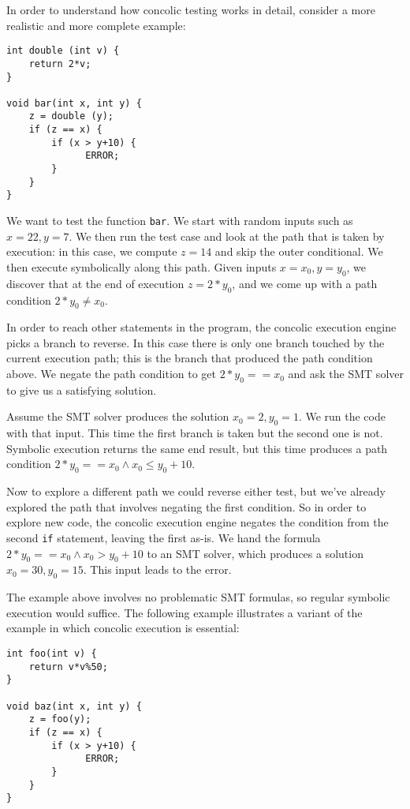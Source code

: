 \documentclass[11pt]{article}
\begin{document}
In order to understand how concolic testing works in detail, consider a more
realistic and more complete example:

\begin{lstlisting}
int double (int v) { 
	return 2*v; 
}

void bar(int x, int y) {
	z = double (y);
	if (z == x) {
		if (x > y+10) {
		      ERROR;
		}	
	}
}
\end{lstlisting}

We want to test the function \texttt{bar}. We start with random inputs such as
$x=22, y=7$. We then run the test case and look at the path that is taken by
execution: in this case, we compute $z=14$ and skip the outer conditional. We
then execute symbolically along this path. Given inputs $x=x_0, y=y_0$, we
discover that at the end of execution $z=2*y_0$, and we come up with a path
condition $2*y_0 \neq x_0$.

In order to reach other statements in the program, the concolic execution engine
picks a branch to reverse. In this case there is only one branch touched by the
current execution path; this is the branch that produced the path condition
above. We negate the path condition to get $2*y_0 == x_0$ and ask the SMT solver
to give us a satisfying solution.

Assume the SMT solver produces the solution $x_0=2, y_0=1$. We run the code with
that input. This time the first branch is taken but the second one is not.
Symbolic execution returns the same end result, but this time produces a path
condition $2*y_0 == x_0 \land x_0 \leq y_0+10$.

Now to explore a different path we could reverse either test, but we've already
explored the path that involves negating the first condition. So in order to
explore new code, the concolic execution engine negates the condition from the
second \texttt{if} statement, leaving the first as-is. We hand the formula
$2*y_0 == x_0 \land x_0 > y_0+10$ to an SMT solver, which produces a solution
$x_0=30, y_0=15$. This input leads to the error.

The example above involves no problematic SMT formulas, so regular symbolic
execution would suffice. The following example illustrates a variant of the
example in which concolic execution is essential:

\begin{lstlisting}
int foo(int v) { 
	return v*v%50;
}

void baz(int x, int y) {
	z = foo(y);
	if (z == x) {
		if (x > y+10) {
		      ERROR;
		}	
	}
}
\end{lstlisting}
\end{document}
